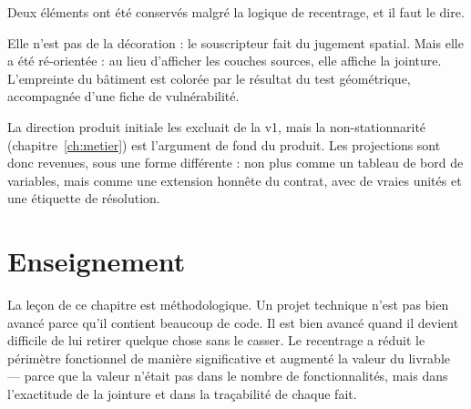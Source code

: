 Deux éléments ont été conservés malgré la logique de recentrage, et il faut le
dire.

\begin{description}[leftmargin=0em,style=nextline]
  \item[La carte.] Elle n'est pas de la décoration : le souscripteur fait du
  jugement spatial. Mais elle a été ré-orientée : au lieu d'afficher les
  couches sources, elle affiche la jointure. L'empreinte du bâtiment est
  colorée par le résultat du test géométrique, accompagnée d'une fiche de
  vulnérabilité.
  \item[Les projections climatiques.] La direction produit initiale les
  excluait de la v1, mais la non-stationnarité (chapitre~\ref{ch:metier}) est
  l'argument de fond du produit. Les projections sont donc revenues, sous une
  forme différente : non plus comme un tableau de bord de variables, mais comme
  une extension honnête du contrat, avec de vraies unités et une étiquette de
  résolution.
\end{description}

\section{Enseignement}

La leçon de ce chapitre est méthodologique. Un projet technique n'est pas
\og bien avancé \fg{} parce qu'il contient beaucoup de code. Il est bien avancé
quand il devient difficile de lui retirer quelque chose sans le casser. Le
recentrage a réduit le périmètre fonctionnel de manière significative et
augmenté la valeur du livrable — parce que la valeur n'était pas dans le
nombre de fonctionnalités, mais dans l'exactitude de la jointure et dans la
traçabilité de chaque fait.

